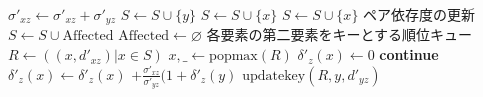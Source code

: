 \begin{algorithm}[tbp]
\begin{multicols}{2}
\begin{algorithmic}[1]
      \EndIf
      \State $\sigma'_{xz}\gets\sigma'_{xz}+\sigma'_{yz}$
      \EndIf
      \State $S\gets S\cup\{y\}$
      \EndIf
      \State $S\gets S\cup\{x\}$
      \EndIf
      \EndFor
      \State $S\gets S\cup\{x\}$
      \EndIf
      \EndWhile
      \State
      \State \LeftComment ペア依存度の更新
      \State $S\gets S\cup\mathrm{Affected}$
      \State $\mathrm{Affected}\gets\varnothing$
      \State \LeftComment 各要素の第二要素をキーとする順位キュー
      \State $R\gets((x,d'_{xz})\vert x\in S)$
      \State $x,\_\gets\mathrm{popmax}(R)$
      \State $\delta'_z(x)\gets 0$
      \State \textbf{continue}
      \EndIf
      \State $\delta'_z(x)\gets\delta'_z(x)$
      $+\frac{\sigma'_{xz}}{\sigma'_{yz}}(1+\delta'_z(y)$
      \State $\mathrm{updatekey}(R, y, d'_{yz})$
      \EndIf
      \EndFor
      \EndWhile
      \EndProcedure
    \end{algorithmic}
  \end{multicols}
\end{algorithm}
